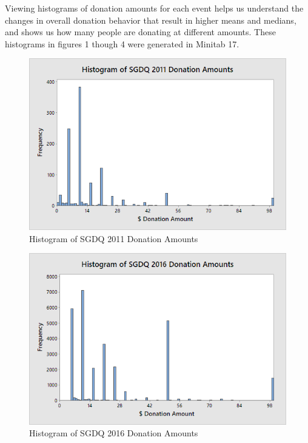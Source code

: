 \documentclass[journal]{IEEEtran}
\begin{document}
Viewing histograms of donation amounts for each event helps us understand the changes in overall donation behavior that result in higher means and medians, and shows us how many people are donating at different amounts. These histograms in figures 1 though 4 were generated in Minitab 17.
\begin{figure}
	\centering
	\includegraphics[scale=0.55]{SGDQ2011Histogram}
	\caption{Histogram of SGDQ 2011 Donation Amounts}
\end{figure}
\begin{figure}
	\centering
	\includegraphics[scale=0.55]{SGDQ2016Histogram}
	\caption{Histogram of SGDQ 2016 Donation Amounts}
\end{figure}
\end{document}
